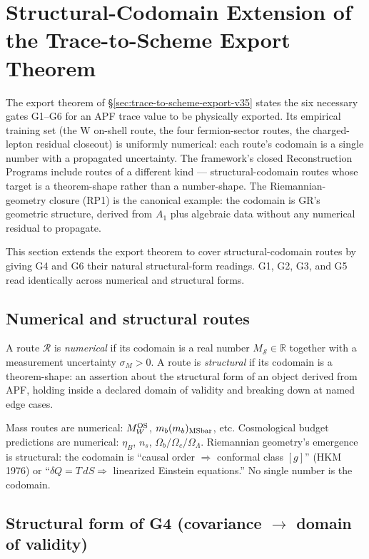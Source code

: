 \section{Structural-Codomain Extension of the Trace-to-Scheme Export Theorem}
\label{sec:structural-codomain-extension}

The export theorem of \S\ref{sec:trace-to-scheme-export-v35} states the six necessary gates G1--G6 for an APF trace value to be physically exported. Its empirical training set (the W on-shell route, the four fermion-sector routes, the charged-lepton residual closeout) is uniformly numerical: each route's codomain is a single number with a propagated uncertainty. The framework's \textsf{closed} Reconstruction Programs include routes of a different kind --- structural-codomain routes whose target is a theorem-shape rather than a number-shape. The Riemannian-geometry closure (RP1) is the canonical example: the codomain is GR's geometric structure, derived from $A_1$ plus algebraic data without any numerical residual to propagate.

This section extends the export theorem to cover structural-codomain routes by giving G4 and G6 their natural structural-form readings. G1, G2, G3, and G5 read identically across numerical and structural forms.

\subsection{Numerical and structural routes}
\label{subsec:numerical-vs-structural}

A route $\mathcal{R}$ is \emph{numerical} if its codomain is a real number $M_{\mathcal{S}} \in \mathbb{R}$ together with a measurement uncertainty $\sigma_M > 0$. A route is \emph{structural} if its codomain is a theorem-shape: an assertion about the structural form of an object derived from APF, holding inside a declared domain of validity and breaking down at named edge cases.

Mass routes are numerical: $M_W^{\rm OS}$, $m_b(m_b)_{\rm MSbar}$, etc. Cosmological budget predictions are numerical: $\eta_B$, $n_s$, $\Omega_b/\Omega_c/\Omega_\Lambda$. Riemannian geometry's emergence is structural: the codomain is ``causal order $\Rightarrow$ conformal class $[g]$'' (HKM 1976) or ``$\delta Q = T\, dS \Rightarrow$ linearized Einstein equations.'' No single number is the codomain.

\subsection{Structural form of G4 (covariance $\to$ domain of validity)}
\label{subsec:G4-structural}


